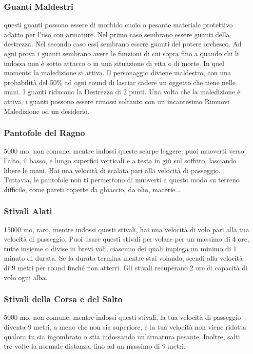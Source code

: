 \begin{multicols}{2}
	\subsubsection*{Guanti Maldestri}
	questi guanti possono essere di morbido cuoio o pesante materiale protettivo adatto per l’uso con armature. Nel primo caso sembrano essere guanti della destrezza. Nel secondo caso essi sembrano essere guanti del potere orchesco. Ad ogni prova i guanti sembrano avere le funzioni di cui sopra fino a quando chi li indossa non è sotto attacco o in una situazione di vita o di morte. In quel momento la maledizione si attiva. Il personaggio diviene maldestro, con una probabilità del 50\% ad ogni round di lasciar cadere un oggetto che tiene nelle mani. I guanti riducono la Destrezza di 2 punti. Una volta che la maledizione è attiva, i guanti possono essere rimossi soltanto con un incantesimo Rimuovi Maledizione od un desiderio.

	\subsubsection*{Pantofole del Ragno}
	5000 mo, non comune, mentre indossi queste scarpe leggere, puoi muoverti verso l'alto, il basso, e lungo superfici verticali e a testa in giù sul soffitto, lasciando libere le mani. Hai una velocità di scalata pari alla velocità di passeggio. Tuttavia, le pantofole non ti permettono di muoverti a questo modo su terreno difficile, come pareti coperte da ghiaccio, da olio, macerie...

	\subsubsection*{Stivali Alati}
	15000 mo, raro, mentre indossi questi stivali, hai una velocità di volo pari alla tua velocità di passeggio. Puoi usare questi stivali per volare per un massimo di 4 ore, tutte insieme o divise in brevi voli, ciascuno dei quali impiega un minimo di 1 minuto di durata. Se la durata termina mentre stai volando, scendi alla velocità di 9 metri per round finché non atterri. Gli stivali recuperano 2 ore di capacità di volo ogni alba.

	\subsubsection*{Stivali della Corsa e del Salto}
	5000 mo, non comune, mentre indossi questi stivali, la tua velocità di passeggio diventa 9 metri, a meno che non sia superiore, e la tua velocità non viene ridotta qualora tu sia ingombrato o stia indossando un'armatura pesante. Inoltre, salti tre volte la normale distanza, fino ad un massimo di 9 metri.


\end{multicols}
